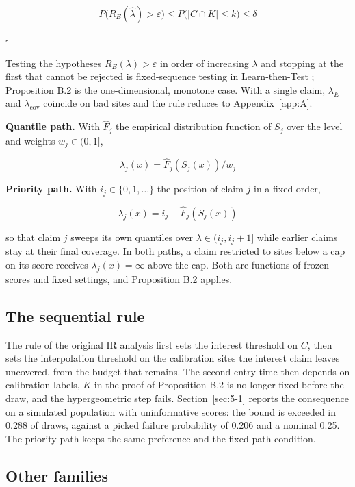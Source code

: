\documentclass{iopjournal}
\begin{document}
\[
P\big(R_E(\hat\lambda) > \varepsilon\big) \le P\big(|C \cap K| \le k\big) \le \delta
\]

\(\square\)

Testing the hypotheses \(R_E(\lambda) > \varepsilon\) in order of increasing \(\lambda\) and stopping at the first that cannot be rejected is fixed-sequence testing in Learn-then-Test \cite{Angelopoulos2025}; Proposition B.2 is the one-dimensional, monotone case. With a single claim, \(\lambda_E\) and \(\lambda_{\mathrm{cov}}\) coincide on bad sites and the rule reduces to Appendix~\ref{app:A}.

\textbf{Quantile path.} With \(\hat F_j\) the empirical distribution function of \(S_j\) over the level and weights \(w_j \in (0, 1]\),

\[
\lambda_j(x) = \hat F_j(S_j(x)) / w_j
\]

\textbf{Priority path.} With \(i_j \in \{0, 1, \dots\}\) the position of claim \(j\) in a fixed order,

\[
\lambda_j(x) = i_j + \hat F_j(S_j(x))
\]

so that claim \(j\) sweeps its own quantiles over \(\lambda \in (i_j, i_j + 1]\) while earlier claims stay at their final coverage. In both paths, a claim restricted to sites below a cap on its score receives \(\lambda_j(x) = \infty\) above the cap. Both are functions of frozen scores and fixed settings, and Proposition B.2 applies.

\hypertarget{the-sequential-rule}{%
\subsection{The sequential rule}\label{the-sequential-rule}}

The rule of the original IR analysis first sets the interest threshold on \(C\), then sets the interpolation threshold on the calibration sites the interest claim leaves uncovered, from the budget that remains. The second entry time then depends on calibration labels, \(K\) in the proof of Proposition B.2 is no longer fixed before the draw, and the hypergeometric step fails. Section~\ref{sec:5-1} reports the consequence on a simulated population with uninformative scores: the bound is exceeded in 0.288 of draws, against a picked failure probability of 0.206 and a nominal 0.25. The priority path keeps the same preference and the fixed-path condition.

\hypertarget{other-families}{%
\subsection{Other families}\label{other-families}}
\end{document}
